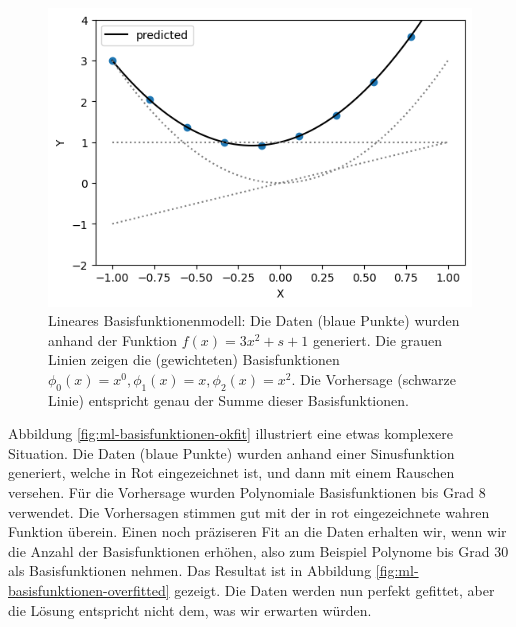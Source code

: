 \begin{figure}[tb]
\includegraphics{Figures/ML-poly-regession-simple.png}
\caption{Lineares Basisfunktionenmodell: Die Daten (blaue Punkte) wurden anhand der Funktion $f(x) = 3 x^2 + s + 1$
generiert. Die grauen Linien zeigen die (gewichteten) Basisfunktionen $\phi_0(x)=x^0, \phi_1(x) = x, \phi_2(x)=x^2$. Die Vorhersage (schwarze Linie) entspricht genau der Summe dieser Basisfunktionen.}
\label{fig:ml-poly-regression-simple}
\end{figure}

Abbildung \ref{fig:ml-basisfunktionen-okfit} illustriert eine etwas komplexere Situation. Die Daten (blaue Punkte) wurden anhand einer Sinusfunktion generiert, welche in Rot eingezeichnet ist, und 
dann mit einem Rauschen versehen. Für die Vorhersage wurden Polynomiale Basisfunktionen bis Grad 8 verwendet. 
Die Vorhersagen stimmen gut mit der in rot eingezeichnete wahren Funktion überein. 
Einen noch präziseren Fit an die Daten erhalten wir, wenn wir die Anzahl der Basisfunktionen erhöhen, also zum Beispiel 
Polynome bis Grad 30 als Basisfunktionen nehmen. Das Resultat ist in Abbildung \ref{fig:ml-basisfunktionen-overfitted} gezeigt. Die Daten werden nun perfekt gefittet, aber die
Lösung entspricht nicht dem, was wir  erwarten würden. 


